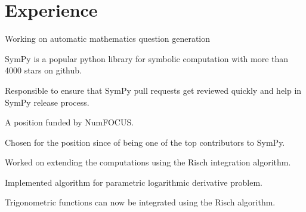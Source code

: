 \documentclass[]{deedy-resume-openfont}
\begin{document}
\begin{minipage}[t]{0.66\textwidth}


\section{Experience}

\vspace{\topsep} %
\vspace{\topsep}
\begin{tightemize}
\item Working on automatic mathematics question generation 
\end{tightemize}
\sectionsep


\vspace{\topsep} %
\vspace{\topsep}
\begin{tightemize}
\item SymPy is a popular python library for symbolic computation with more than 4000 stars on github.
\item Responsible to ensure that SymPy pull requests get reviewed quickly and help in SymPy release process.
\item A position funded by NumFOCUS.
\item Chosen for the position since of being one of the top contributors to SymPy.
\end{tightemize}
\sectionsep

\vspace{\topsep} %
\begin{tightemize}
\item Worked on extending the computations using the Risch integration algorithm.
\item Implemented algorithm for parametric logarithmic derivative problem.
\item Trigonometric functions can now be integrated using the Risch algorithm.
\end{tightemize}
\sectionsep


\end{minipage}
\end{document}
